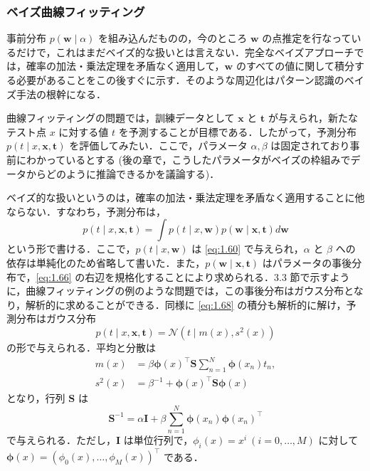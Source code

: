 \documentclass[uplatex,a4paper,oneside,openany,dvipdfmx]{jsarticle}
\numberwithin{equation}{section}
\theoremstyle{mystyle} %
\newcommand{\CN}{\mathcal{N}}
\newcommand{\mb}[1]{\mathbf{#1}}
\newcommand{\bs}[1]{\boldsymbol{#1}}
\begin{document}
\subsubsection{ベイズ曲線フィッティング} \label{subsubsec:Bayesian curve fitting}

事前分布 $p(\bs{w} \mid \alpha)$ を組み込んだものの，今のところ $\bs{w}$ の点推定を行なっているだけで，これはまだベイズ的な扱いとは言えない．完全なベイズアプローチでは，確率の加法・乗法定理を矛盾なく適用して，$\bs{w}$ のすべての値に関して積分する必要があることをこの後すぐに示す．そのような周辺化はパターン認識のベイズ手法の根幹になる．

曲線フィッティングの問題では，訓練データとして $\mb{x}$ と $\mb{t}$ が与えられ，新たなテスト点 $x$ に対する値 $t$ を予測することが目標である．したがって，予測分布 $p(t \mid x,\mb{x},\mb{t})$ を評価してみたい．ここで，パラメータ $\alpha,\beta$ は固定されており事前にわかっているとする (後の章で，こうしたパラメータがベイズの枠組みでデータからどのように推論できるかを議論する)．

ベイズ的な扱いというのは，確率の加法・乗法定理を矛盾なく適用することに他ならない．すなわち，予測分布は，
\begin{equation} \label{eq:1.68}
    p(t \mid x,\mb{x},\mb{t}) = \int p(t \mid x,\bs{w}) p(\bs{w} \mid \mb{x},\mb{t}) d{\bs{w}}
\end{equation}
という形で書ける．ここで，$p(t \mid x,\bs{w})$ は \eqref{eq:1.60} で与えられ，$\alpha$ と $\beta$ への依存は単純化のため省略して書いた．また，$p(\bs{w} \mid \mb{x},\mb{t})$ はパラメータの事後分布で，\eqref{eq:1.66} の右辺を規格化することにより求められる．3.3 節で示すように，曲線フィッティングの例のような問題では，この事後分布はガウス分布となり，解析的に求めることができる．同様に \eqref{eq:1.68} の積分も解析的に解け，予測分布はガウス分布
\begin{equation} \label{eq:1.69}
    p(t \mid x,\mb{x},\mb{t}) = \CN\left(t \mid m(x),s^{2}(x)\right)
\end{equation}
の形で与えられる．平均と分散は
\begin{align}
    m(x) &= \beta\bs{\phi}(x)^{\top} \mb{S} \sum_{n=1}^{N} \bs{\phi}(x_{n}) t_{n}, \label{eq:1.70} \\
    s^{2}(x) &= \beta^{-1} + \bs{\phi}(x)^{\top} \mb{S} \bs{\phi}(x) \label{eq:1.71}
\end{align}
となり，行列 $\mb{S}$ は
\begin{equation} \label{eq:1.72}
    \mb{S}^{-1} = \alpha \mb{I} + \beta \sum_{n=1}^{N} \bs{\phi}(x_{n})\bs{\phi}(x_{n})^{\top}
\end{equation}
で与えられる．ただし，$\mb{I}$ は単位行列で，$\phi_{i}(x) = x^{i}\ (i=0,\ldots,M)$ に対して $\bs{\phi}(x) = (\phi_{0}(x),\ldots,\phi_{M}(x))^{\top}$ である．
\end{document}
